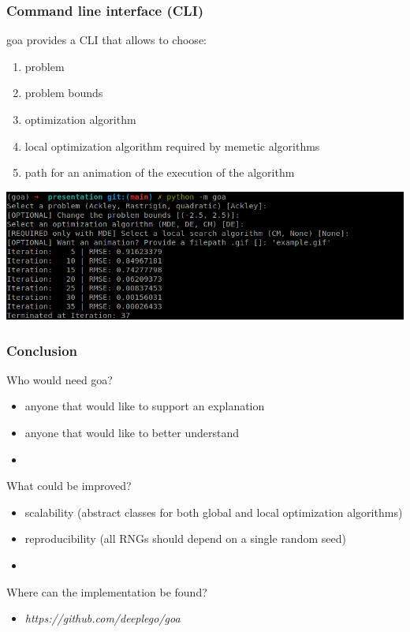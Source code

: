 \documentclass{beamer}
\begin{document}
\begin{frame}
\frametitle{Command line interface (CLI)}
  goa provides a CLI that allows to choose:
  \begin{enumerate}
    \item problem
    \item problem bounds
    \item optimization algorithm
    \item local optimization algorithm required by memetic algorithms
    \item path for an animation of the execution of the algorithm
  \end{enumerate}
  \includegraphics[width=1.0\textwidth]{figures/cli-screenshot}
\end{frame}
\begin{frame}
\frametitle{Conclusion}

  Who would need goa?
  \begin{itemize}
    \item anyone that would like to support an explanation
    \item anyone that would like to better understand
  \end{itemize}

  \begin{itemize}
    \item[]
  \end{itemize}

  What could be improved?
  \begin{itemize}
    \item scalability (abstract classes for both global and local optimization algorithms)
    \item reproducibility (all RNGs should depend on a single random seed)
  \end{itemize}

  \begin{itemize}
    \item[]
  \end{itemize}

  Where can the implementation be found?
  \begin{itemize}
    \item \textit{https://github.com/deeplego/goa}
  \end{itemize}

\end{frame}
\end{document}
